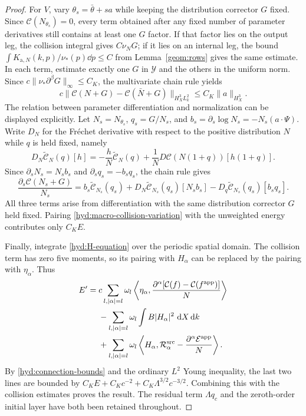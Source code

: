 \begin{proof}
 For $V$, vary $\theta_s=\bar\theta+sa$ while keeping the distribution
 corrector $G$ fixed. Since $\mathcal C(N_{\theta_s})=0$, every term
 obtained after any fixed number of parameter derivatives still
 contains at least one $G$ factor. If that factor lies on the output
 leg, the collision integral gives $C\nu_NG$; if it lies on an internal
 leg, the bound
 $\int K_{\mathrm a,N}(k,p)/\nu_*(p)\dd p\le C$ from
 Lemma~\ref{geom:rows} gives the same estimate. In each term, estimate
 exactly one $G$ in $\mathcal Y$ and the others in the uniform norm.
 Since $c\|\nu_*\partial^\beta G\|_\infty\le C_K$, the multivariate
 chain rule yields
 \begin{equation}\label{hyd:macro-collision-variation}
 c\|\mathcal C(N+G)-\mathcal C(\bar N+G)\|_{H_X^3L_k^2}
       \le C_K\|a\|_{H_X^3}.
 \end{equation}
 The relation between parameter differentiation and normalization can
 be displayed explicitly. Let $N_s=N_{\theta_s}$, $q_s=G/N_s$, and
 $b_s=\partial_s\log N_s=-N_s(a\cdot\Psi)$. Write $D_N$ for the
 Fr\'echet derivative with respect to the positive distribution $N$
 while $q$ is held fixed, namely
 \[
 D_N\widetilde{\mathcal C}_N(q)[h]
  =-\frac hN\widetilde{\mathcal C}_N(q)
    +\frac1N D\mathcal C(N(1+q))[h(1+q)].
 \]
 Since $\partial_sN_s=N_sb_s$ and $\partial_sq_s=-b_sq_s$, the chain
 rule gives
 \[
 \frac{\partial_s\mathcal C(N_s+G)}{N_s}
 =b_s\widetilde{\mathcal C}_{N_s}(q_s)
  +D_N\widetilde{\mathcal C}_{N_s}(q_s)[N_sb_s]
  -D_q\widetilde{\mathcal C}_{N_s}(q_s)[b_sq_s].
 \]
 All three terms arise from differentiation with the same distribution
 corrector $G$ held fixed. Pairing
 \eqref{hyd:macro-collision-variation} with the unweighted energy
 contributes only $C_KE$.

 Finally, integrate \eqref{hyd:H-equation} over the periodic spatial
 domain. The collision term has zero five moments, so its pairing with
 $H_\alpha$ can be replaced by the pairing with $\eta_\alpha$. Thus
 \begin{align}
 E'={}&c\sum_{l,|\alpha|=l}\omega_l
  \left\langle\eta_\alpha,
     \frac{\partial^\alpha[\mathcal C(f)-\mathcal C(f^{\mathrm{app}})]}{N}
  \right\rangle\notag\\
 &-\sum_{l,|\alpha|=l}\omega_l\int B|H_\alpha|^2\,\,\mathrm d X\,\mathrm d k\notag\\
 &+\sum_{l,|\alpha|=l}\omega_l
  \left\langle H_\alpha,\mathcal R_\alpha^{\mathrm{src}}
               -\frac{\partial^\alpha\mathcal E^{\mathrm{app}}}{N}\right\rangle.
 \label{hyd:exact-energy}
 \end{align}
 By \eqref{hyd:connection-bounds} and the ordinary $L^2$ Young
 inequality, the last two lines are bounded by
 $C_KE+C_Kc^{-2}+C_K\Lambda^{3/2}c^{-3/2}$.
 Combining this with the collision estimates proves the result.
 The residual term $\Lambda q_c$ and the zeroth-order initial layer
 have both been retained throughout.
\end{proof}

